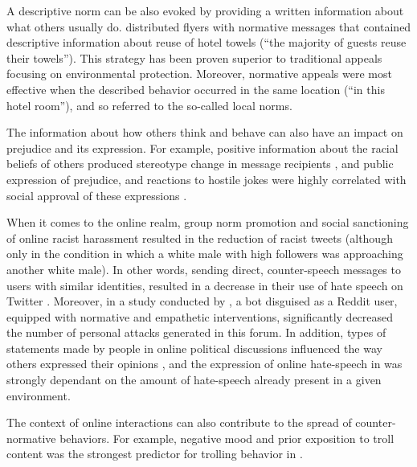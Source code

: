 \documentclass[preprint,12pt]{elsarticle}
\begin{document}

A descriptive norm can be also evoked by providing a written information about what others usually do. \citet{goldstein2008room} distributed flyers with normative messages that contained descriptive information about reuse of hotel towels (“the majority of guests reuse their towels”). This strategy has been proven superior to traditional appeals focusing on environmental protection. Moreover, normative appeals were most effective when the described behavior occurred in the same location (“in this hotel  room”), and so referred to the so-called local norms. 

The information about how others think and behave can also have an impact on prejudice and its expression. For example, positive information about the racial beliefs of others produced stereotype change in message recipients \citep{stangor2001changing}, and public expression of prejudice, and reactions to hostile jokes were highly correlated with social approval of these expressions \citep{crandall2002social}. 

When it comes to the online realm, group norm promotion and social sanctioning of online racist harassment resulted in the reduction of racist tweets (although only in the condition in which a white male with high followers was approaching another white male). In other words, sending direct, counter-speech messages to users with similar identities,  resulted in a decrease in their use of hate speech on Twitter \citep{munger2017tweetment}. Moreover, in a study conducted by \citet{bilewicz2021artificial}, a bot disguised as a Reddit user, equipped with normative and empathetic interventions, significantly decreased the number of personal attacks generated in this forum. In addition, types of statements made by people in online political discussions influenced the way others expressed their opinions \citep{price2006normative}, and the expression of online hate-speech in  \citep{alvarez2018normative} was strongly dependant on the amount of hate-speech already present in a given environment.  

The context of online interactions can also contribute to the spread of counter-normative behaviors. For example, negative mood and prior exposition to troll content was the strongest predictor for trolling behavior in \citep{cheng2017anyone}.


\end{document}
